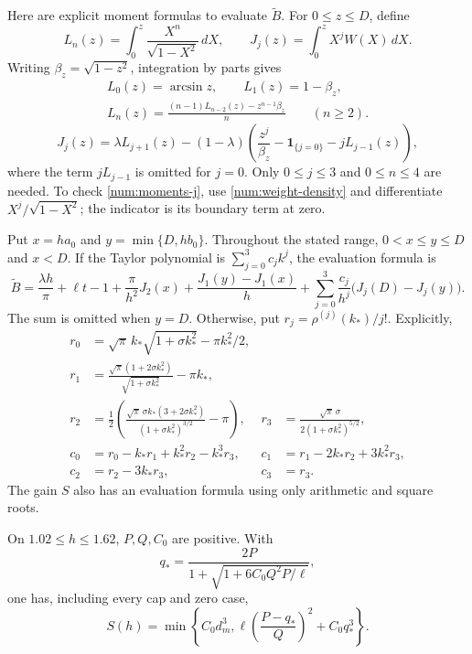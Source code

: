 Here are explicit moment formulas to evaluate $\widetilde B$.
For $0\le z\le D$, define
\[
 L_n(z)=\int_0^z\frac{X^n}{\sqrt{1-X^2}}\,dX,
 \qquad J_j(z)=\int_0^z X^jW(X)\,dX.
\]
Writing $\beta_z=\sqrt{1-z^2}$, integration by parts gives
\begin{equation}\label{num:moments-l}
 \begin{gathered}
 L_0(z)=\arcsin z,\qquad L_1(z)=1-\beta_z,\\
 L_n(z)=\frac{(n-1)L_{n-2}(z)-z^{n-1}\beta_z}{n}\qquad(n\ge2).
 \end{gathered}
\end{equation}
\begin{equation}\label{num:moments-j}
 J_j(z)=\lambda L_{j+1}(z)
 -(1-\lambda)\left(\frac{z^j}{\beta_z}
       -\mathbf1_{\{j=0\}}-jL_{j-1}(z)\right),
\end{equation}
where the term $jL_{j-1}$ is omitted for $j=0$.
Only $0\le j\le3$ and $0\le n\le4$ are needed. To check
\eqref{num:moments-j}, use \eqref{num:weight-density} and
differentiate $X^j/\sqrt{1-X^2}$; the indicator is its boundary
term at zero.

Put $x=ha_0$ and $y=\min\{D,hb_0\}$. Throughout the stated range,
$0<x\le y\le D$ and $x<D$. If the Taylor polynomial is
$\sum_{j=0}^3c_jk^j$, the evaluation formula is
\begin{equation}\label{num:evaluation-b}
 \widetilde B=\frac{\lambda h}{\pi}+\ell t-1
  +\frac\pi{h^2}J_2(x)+\frac{J_1(y)-J_1(x)}h
  +\sum_{j=0}^3\frac{c_j}{h^j}\bigl(J_j(D)-J_j(y)\bigr).
\end{equation}
The sum is omitted when $y=D$. Otherwise, put
$r_j=\rho^{(j)}(k_*)/j!$. Explicitly,
\begin{align*}
 r_0&=\sqrt\pi\,k_*\sqrt{1+\sigma k_*^2}-\pi k_*^2/2,\\
 r_1&=\frac{\sqrt\pi(1+2\sigma k_*^2)}{\sqrt{1+\sigma k_*^2}}
       -\pi k_*,\\
 r_2&=\frac12\left(
 \frac{\sqrt\pi\,\sigma k_*(3+2\sigma k_*^2)}
      {(1+\sigma k_*^2)^{3/2}}-\pi\right),
 &r_3&=\frac{\sqrt\pi\,\sigma}{2(1+\sigma k_*^2)^{5/2}},\\
 c_0&=r_0-k_*r_1+k_*^2r_2-k_*^3r_3,
 &c_1&=r_1-2k_*r_2+3k_*^2r_3,\\
 c_2&=r_2-3k_*r_3,&c_3&=r_3.
\end{align*}
The gain $S$ also has an evaluation formula using only arithmetic
and square roots.

\begin{lemma}\label{nest:s-formula}
On $1.02\leq h\leq1.62$, $P,Q,C_0$ are positive.  With
\begin{equation}\label{nest:s-critical-point}
 q_*=\frac{2P}{1+\sqrt{1+6C_0Q^2P/\ell}},
\end{equation}
one has, including every cap and zero case,
\begin{equation}\label{nest:s-explicit}
 S(h)=\min\left\{C_0d_m^3,
       \ell\left(\frac{P-q_*}{Q}\right)^2+C_0q_*^3\right\}.
\end{equation}
\end{lemma}

